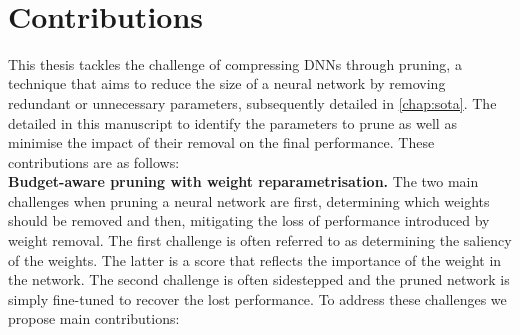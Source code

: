 \DIFaddbegin {}\\
\DIFaddend 


\section{Contributions}

This thesis tackles the challenge of compressing \acp{DNN} through pruning, a
technique that aims to reduce the size of a neural network by removing redundant
or unnecessary parameters, subsequently detailed in \cref{chap:sota}. The
\DIFdelbegin {}\DIFdelend \DIFaddbegin {}\DIFaddend detailed in this manuscript \DIFdelbegin {}\DIFdelend \DIFaddbegin {}\DIFaddend to identify the
parameters to prune as well as minimise the impact of their removal on the final
performance. These contributions are as follows:\\

\noindent \textbf{Budget-aware pruning with weight reparametrisation.} The two
main challenges when pruning a neural network are first, determining which
weights should be removed and then, mitigating the loss of performance
introduced by weight removal. The first challenge is often referred to as
determining the saliency of the weights. The latter is a score that reflects the
importance of the weight in the network. The second challenge is often
sidestepped and the pruned network is simply fine-tuned to recover the lost
performance. To address these challenges we propose \DIFdelbegin {}\DIFdelend \DIFaddbegin {}\DIFaddend main
contributions:

